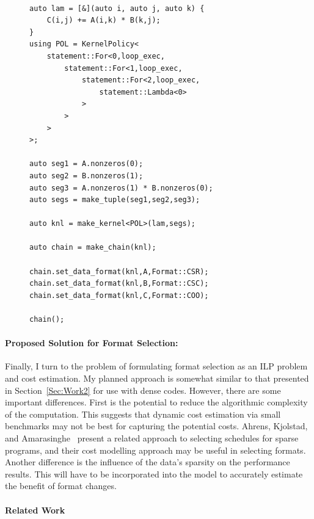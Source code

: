 \documentclass{article}
\begin{document}
\begin{figure}
\begin{lstlisting}[caption={Possible RAJA implementation of Sparse Matrix Multiply.}, label={SparseMMRaja}]
    
auto lam = [&](auto i, auto j, auto k) {
    C(i,j) += A(i,k) * B(k,j);
}
using POL = KernelPolicy<
    statement::For<0,loop_exec,
        statement::For<1,loop_exec,
            statement::For<2,loop_exec,
                statement::Lambda<0>
            >
        >
    >
>;

auto seg1 = A.nonzeros(0);
auto seg2 = B.nonzeros(1);
auto seg3 = A.nonzeros(1) * B.nonzeros(0);
auto segs = make_tuple(seg1,seg2,seg3);

auto knl = make_kernel<POL>(lam,segs);

auto chain = make_chain(knl);

chain.set_data_format(knl,A,Format::CSR);
chain.set_data_format(knl,B,Format::CSC);
chain.set_data_format(knl,C,Format::COO);

chain();

\end{lstlisting}
\end{figure}

\paragraph{Proposed Solution for Format Selection:}
Finally, I turn to the problem of formulating format selection as an ILP problem and cost estimation.
My planned approach is somewhat similar to that presented in Section~\ref{Sec:Work2} for use with dense codes.
However, there are some important differences. 
First is the potential to reduce the algorithmic complexity of the computation. 
This suggests that dynamic cost estimation via small benchmarks may not be best for capturing the potential costs.
Ahrens, Kjolstad, and Amarasinghe~\cite{ahrens2021asymptotic} present a related approach to selecting schedules for sparse programs, and their cost modelling approach may be useful in selecting formats.
Another difference is the influence of the data's sparsity on the performance results. 
This will have to be incorporated into the model to accurately estimate the benefit of format changes.


\paragraph{Related Work}
\end{document}
